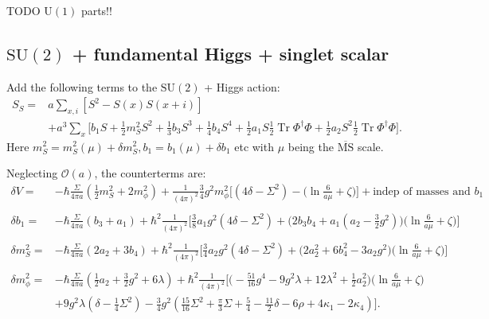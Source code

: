 \documentclass[11pt,a4paper]{article}
\newcommand\Tr{\operatorname{Tr}}
\newcommand\MSbar{$\overline{\text{MS}}$ } %
\newcommand\he[1]{#1^\dagger}%
\newcommand\gr[1]{\mathrm{#1}}%
\newcommand\lauri[1]{{\color{myorange}#1}}
\begin{document}
\lauri{TODO $\gr{U(1)}$ parts!!}


\subsection{$\gr{SU(2)}$ + fundamental Higgs + singlet scalar}

Add the following terms to the $\gr{SU(2)}$ + Higgs action:
\begin{align}
S_S =& a \sum_{x,i} \left[ S^2 - S(x) S(x+i)\right] \nonumber \\
&+ a^3 \sum_x \Big[ b_1 S + \frac12 m^2_S S^2 + \frac13 b_3 S^3 + \frac14 b_4 S^4 + \frac12 a_1 S \frac12 \Tr \he\Phi\Phi + \frac12 a_2 S^2 \frac12 \Tr \he\Phi\Phi \Big].  
\end{align}
Here $m^2_S = m^2_S(\mu) + \delta m_S^2, b_1 = b_1(\mu) + \delta b_1$ etc with $\mu$ being the \MSbar scale.

Neglecting $\mathcal{O}(a)$, the counterterms are:
\begin{align}
\delta V =& -\hbar \frac{\Sigma}{4\pi a} \left( \frac12 m_S^2 + 2 m_\phi^2 \right) + \frac{1}{(4\pi)^2} \frac34 g^2 m_\phi^2 \Big[ (4\delta - \Sigma^2) - \Big( \ln\frac{6}{a\mu} + \zeta \Big) \Big] + \text{indep of masses and } b_1 \\
\nonumber\\
\delta b_1 =& -\hbar \frac{\Sigma}{4\pi a}\left(b_3  + a_1\right) + \hbar^2 \frac{1}{(4\pi)^2} \Big[ \frac38 a_1 g^2 (4\delta - \Sigma^2) + \Big( 2 b_3 b_4 + a_1(a_2 - \frac32 g^2) \Big) \Big( \ln\frac{6}{a\mu} + \zeta \Big) \Big] \\
\nonumber\\
\delta m^2_S =& -\hbar \frac{\Sigma}{4\pi a} (2a_2 + 3b_4) + \hbar^2 \frac{1}{(4\pi)^2} \Big[ \frac34 a_2 g^2 (4\delta - \Sigma^2) + \Big( 2a_2^2 + 6b_4^2 - 3a_2 g^2 \Big)\Big( \ln\frac{6}{a\mu} + \zeta \Big) \Big] \\
\nonumber\\
\delta m^2_\phi =& -\hbar \frac{\Sigma}{4\pi a}\left( \frac12 a_2 + \frac32 g^2 + 6\lambda \right) + \hbar^2 \frac{1}{(4\pi)^2} \Big[ \Big( -\frac{51}{16}g^4 - 9g^2\lambda +12\lambda^2 + \frac12 a_2^2 \Big)\Big( \ln\frac{6}{a\mu} + \zeta \Big)  \nonumber \\
% 
& + 9 g^2 \lambda \left(\delta - \frac14 \Sigma^2 \right) - \frac34 g^2 \left( \frac{15}{16} \Sigma^2  + \frac{\pi}{3}\Sigma + \frac54 - \frac{11}{2}\delta - 6\rho + 4\kappa_1 - 2\kappa_4 \right)\Big]  .
\end{align}
\end{document}
